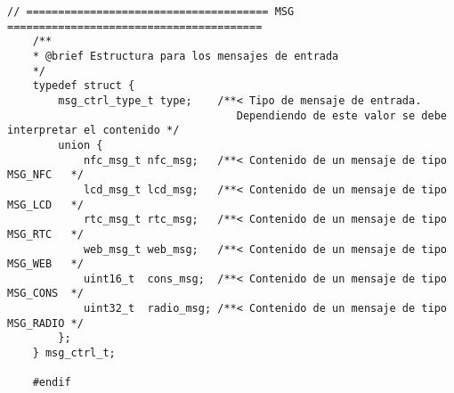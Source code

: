 \begin{lstlisting}[captionpos=t, caption={Fichero \texttt{controlThread.h} con las estructuras de mensajes}]
    // ====================================== MSG ========================================
    /**
    * @brief Estructura para los mensajes de entrada
    */
    typedef struct {
        msg_ctrl_type_t type;    /**< Tipo de mensaje de entrada. 
                                    Dependiendo de este valor se debe interpretar el contenido */
        union {
            nfc_msg_t nfc_msg;   /**< Contenido de un mensaje de tipo MSG_NFC   */
            lcd_msg_t lcd_msg;   /**< Contenido de un mensaje de tipo MSG_LCD   */
            rtc_msg_t rtc_msg;   /**< Contenido de un mensaje de tipo MSG_RTC   */
            web_msg_t web_msg;   /**< Contenido de un mensaje de tipo MSG_WEB   */
            uint16_t  cons_msg;  /**< Contenido de un mensaje de tipo MSG_CONS  */
            uint32_t  radio_msg; /**< Contenido de un mensaje de tipo MSG_RADIO */
        };
    } msg_ctrl_t;

    #endif
    
\end{lstlisting}